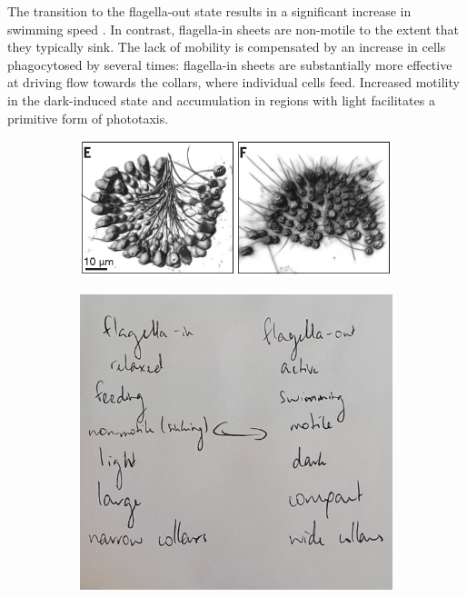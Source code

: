 The transition to the flagella-out state results in a significant increase in swimming speed \citep{brunet2019}. 
In contrast, flagella-in sheets are non-motile to the extent that they typically sink. 
The lack of mobility is compensated by an increase in cells phagocytosed by several times: flagella-in sheets are substantially more effective at driving flow towards the collars, where individual cells feed.
Increased motility in the dark-induced state and accumulation in regions with light facilitates a primitive form of phototaxis.

\begin{figure}[htbp]
	\centering
	\begin{subfigure}[b]{0.7\textwidth}
		\centering
		\includegraphics[width=\textwidth]{cflexa.png}
		\caption{}
		\label{subfig:cflexa}
	\end{subfigure}
	\begin{subfigure}[b]{0.29\textwidth}
		\centering
		\includegraphics[width=\textwidth]{table.jpg}

\end{subfigure}
\end{figure}
